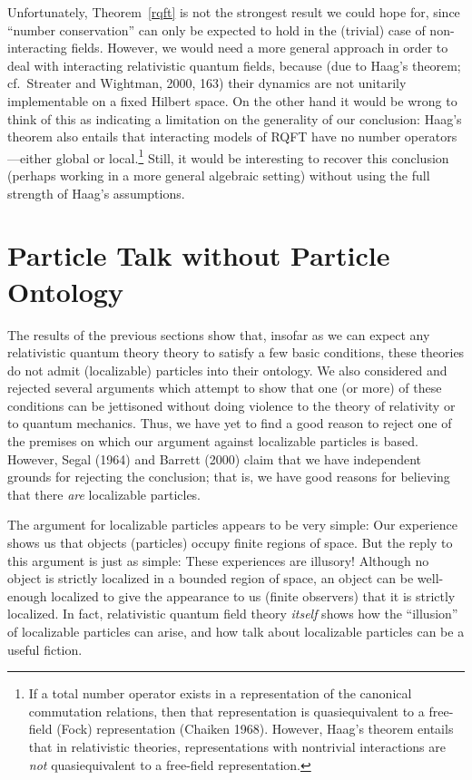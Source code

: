 \documentclass[11pt]{article}
\theoremstyle{remark}
\begin{document}
Unfortunately, Theorem~\ref{rqft} is not the strongest result we could
hope for, since ``number conservation'' can only be expected to hold
in the (trivial) case of non-interacting fields.  However, we would
need a more general approach in order to deal with interacting
relativistic quantum fields, because (due to Haag's theorem;
cf.~Streater and Wightman, 2000, 163) their dynamics are not unitarily
implementable on a fixed Hilbert space.  On the other hand it would be
wrong to think of this as indicating a limitation on the generality of
our conclusion: Haag's theorem also entails that interacting models of
RQFT have no number operators---either global or local.\footnote{If a
  total number operator exists in a representation of the canonical
  commutation relations, then that representation is quasiequivalent
  to a free-field (Fock) representation (Chaiken 1968).  However,
  Haag's theorem entails that in relativistic theories,
  representations with nontrivial interactions are \emph{not}
  quasiequivalent to a free-field representation.}  Still, it would be
interesting to recover this conclusion (perhaps working in a more
general algebraic setting) without using the full strength of Haag's
assumptions.

\section{Particle Talk without Particle Ontology}
The results of the previous sections show that, insofar as we can
expect any relativistic quantum theory theory to satisfy a few basic
conditions, these theories do not admit (localizable) particles into
their ontology.  We also considered and rejected several arguments
which attempt to show that one (or more) of these conditions can be
jettisoned without doing violence to the theory of relativity or to
quantum mechanics.  Thus, we have yet to find a good reason to reject
one of the premises on which our argument against localizable
particles is based.  However, Segal (1964) and Barrett (2000) claim
that we have independent grounds for rejecting the conclusion; that
is, we have good reasons for believing that there \emph{are}
localizable particles.

The argument for localizable particles appears to be very simple: Our
experience shows us that objects (particles) occupy finite regions of
space.  But the reply to this argument is just as simple: These
experiences are illusory!  Although no object is strictly localized in
a bounded region of space, an object can be well-enough localized to
give the appearance to us (finite observers) that it is strictly
localized.  In fact, relativistic quantum field theory \emph{itself}
shows how the ``illusion'' of localizable particles can arise, and how
talk about localizable particles can be a useful fiction.
\end{document}
